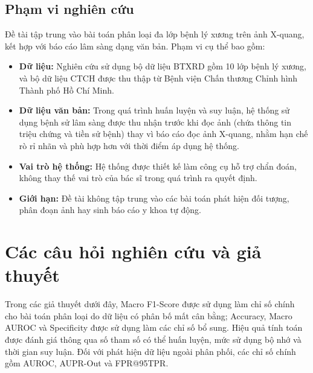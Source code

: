 \subsection{Phạm vi nghiên cứu}
Đề tài tập trung vào bài toán phân loại đa lớp bệnh lý xương trên ảnh X-quang, kết hợp với báo cáo lâm sàng dạng văn bản. Phạm vi cụ thể bao gồm:

\begin{itemize}
  \item \textbf{Dữ liệu:} Nghiên cứu sử dụng bộ dữ liệu BTXRD gồm 10 lớp bệnh lý xương, và bộ dữ liệu CTCH được thu thập từ Bệnh viện Chấn thương Chỉnh hình Thành phố Hồ Chí Minh.
  \item \textbf{Dữ liệu văn bản:} Trong quá trình huấn luyện và suy luận, hệ thống sử dụng bệnh sử lâm sàng được thu nhận trước khi đọc ảnh (chứa thông tin triệu chứng và tiền sử bệnh) thay vì báo cáo đọc ảnh X-quang, nhằm hạn chế rò rỉ nhãn và phù hợp hơn với thời điểm áp dụng hệ thống.
  \item \textbf{Vai trò hệ thống:} Hệ thống được thiết kế làm công cụ hỗ trợ chẩn đoán, không thay thế vai trò của bác sĩ trong quá trình ra quyết định.
  \item \textbf{Giới hạn:} Đề tài không tập trung vào các bài toán phát hiện đối tượng, phân đoạn ảnh hay sinh báo cáo y khoa tự động.
\end{itemize}

\section{Các câu hỏi nghiên cứu và giả thuyết}
Trong các giả thuyết dưới đây, Macro F1-Score được sử dụng làm chỉ số chính cho bài toán phân loại do dữ liệu có phân bố mất cân bằng; Accuracy, Macro AUROC và Specificity được sử dụng làm các chỉ số bổ sung. Hiệu quả tính toán được đánh giá thông qua số tham số có thể huấn luyện, mức sử dụng bộ nhớ và thời gian suy luận. Đối với phát hiện dữ liệu ngoài phân phối, các chỉ số chính gồm AUROC, AUPR-Out và FPR@95TPR.


